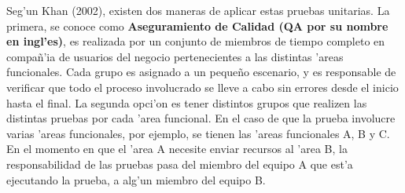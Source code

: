 \indent Seg'un Khan (2002), existen dos maneras de aplicar estas pruebas unitarias. La primera, se conoce como \textbf{Aseguramiento de Calidad (QA por su nombre en ingl'es)}, es realizada por un conjunto de miembros de tiempo completo en compa\~n'ia de usuarios del negocio pertenecientes a las distintas 'areas funcionales. Cada grupo es asignado a un peque\~no escenario, y es responsable de verificar que todo el proceso involucrado se lleve a cabo sin errores desde el inicio hasta el final. La segunda opci'on es tener distintos grupos que realizen las distintas pruebas por cada 'area funcional. En el caso de que la prueba involucre varias 'areas funcionales, por ejemplo, se tienen las 'areas funcionales A, B y C. En el momento en que el 'area A necesite enviar recursos al 'area B, la responsabilidad de las pruebas pasa del miembro del equipo A que est'a ejecutando la prueba, a alg'un miembro del equipo B.


